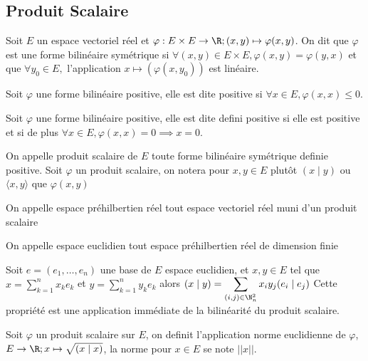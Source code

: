 \subsection{Produit Scalaire}
\begin{defini}
    Soit $E$ un espace vectoriel réel  et $\varphi : E\times E \to \R; (x,y)\mapsto \varphi(x,y)$. On dit que $\varphi$ est une forme bilinéaire symétrique si $\forall (x,y)\in E\times E, \varphi(x,y)=\varphi(y,x)$ et que $\forall y_0\in E,$ l'application $x \mapsto (\varphi(x,y_0))$ est linéaire.
\end{defini}
\begin{defini}
    Soit $\varphi$ une forme bilinéaire positive, elle est dite positive si $\forall x\in E, \varphi(x,x)\leq 0$.
\end{defini}
\begin{defini}
    Soit $\varphi$ une forme bilinéaire positive, elle est dite defini positive si elle est positive et si  de plus $\forall x\in E, \varphi(x,x)=0\implies x=0$.
\end{defini}
\begin{defini}
    On appelle produit scalaire de $E$ toute forme bilinéaire symétrique definie positive.
    Soit $\varphi$ un produit scalaire, on notera pour $x,y\in E$ plutôt $(x\mid y)$ ou $ \langle x,y\rangle $ que $\varphi(x,y)$
\end{defini}
\begin{defini}
    On appelle espace préhilbertien réel tout espace vectoriel réel muni d'un produit scalaire
\end{defini}
\begin{defini}
    On appelle espace euclidien tout espace préhilbertien réel de dimension finie
\end{defini}
\begin{prop}
    Soit $e=(e_1,\dots,e_n)$ une base de $E$ espace euclidien, et $x,y\in E$ tel que $\displaystyle x=\sum_{k=1}^n x_k e_k$ et $\displaystyle y=\sum_{k=1}^n y_k e_k$ alors $\displaystyle(x\mid y)=\sum_{(i,j)\in \N_n^2}x_iy_j(e_i\mid e_j)$
    \tcblower
    Cette propriété est une application immédiate de la bilinéarité du produit scalaire.
\end{prop}
\begin{defini}
    Soit $\varphi$ un produit scalaire sur $E$, on definit l'application norme euclidienne de $\varphi$, $E\to\R; x\mapsto \sqrt{(x\mid x)}$, la norme pour $x\in E$ se note $||x||$.
\end{defini}
